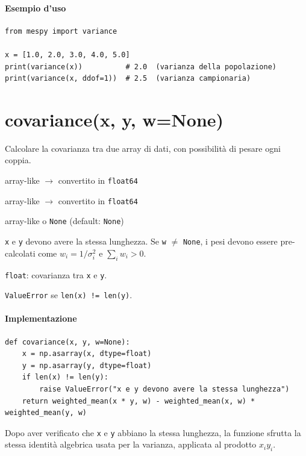 \paragraph{Esempio d'uso}
\begin{verbatim}
from mespy import variance

x = [1.0, 2.0, 3.0, 4.0, 5.0]
print(variance(x))          # 2.0  (varianza della popolazione)
print(variance(x, ddof=1))  # 2.5  (varianza campionaria)
\end{verbatim}

\section{covariance(x, y, w=None)}
\label{sec:covariance}
\begin{apidesc}
  \item[\textbf{Scopo}]
    Calcolare la covarianza tra due array di dati, con possibilità di pesare ogni coppia.
  \item[\textbf{Parametri}]\hfill
    \begin{description}[font=\normalfont\ttfamily\bfseries, labelwidth=1.5em, leftmargin=2em, itemsep=1pt, parsep=0pt, topsep=1pt]
      \item[x] array-like $\to$ convertito in \texttt{float64}
      \item[y] array-like $\to$ convertito in \texttt{float64}
      \item[w] array-like o \texttt{None} (default: \texttt{None})
    \end{description}
  \item[\textbf{Vincoli}]
    \texttt{x} e \texttt{y} devono avere la stessa lunghezza.
    Se \texttt{w} $\neq$ \texttt{None}, i pesi devono essere pre-calcolati come
    $w_i = 1/\sigma_i^2$ e $\sum_i w_i > 0$.
  \item[\textbf{Restituisce}]
    \texttt{float}: covarianza tra \texttt{x} e \texttt{y}.
  \item[\textbf{Eccezioni}]
    \texttt{ValueError} se \texttt{len(x) != len(y)}.
\end{apidesc}

\paragraph{Implementazione}
\begin{verbatim}
def covariance(x, y, w=None):
    x = np.asarray(x, dtype=float)
    y = np.asarray(y, dtype=float)
    if len(x) != len(y):
        raise ValueError("x e y devono avere la stessa lunghezza")
    return weighted_mean(x * y, w) - weighted_mean(x, w) * weighted_mean(y, w)
\end{verbatim}
Dopo aver verificato che \texttt{x} e \texttt{y} abbiano la stessa lunghezza,
la funzione sfrutta la stessa identità algebrica usata per la varianza, applicata
al prodotto $x_i y_i$.

